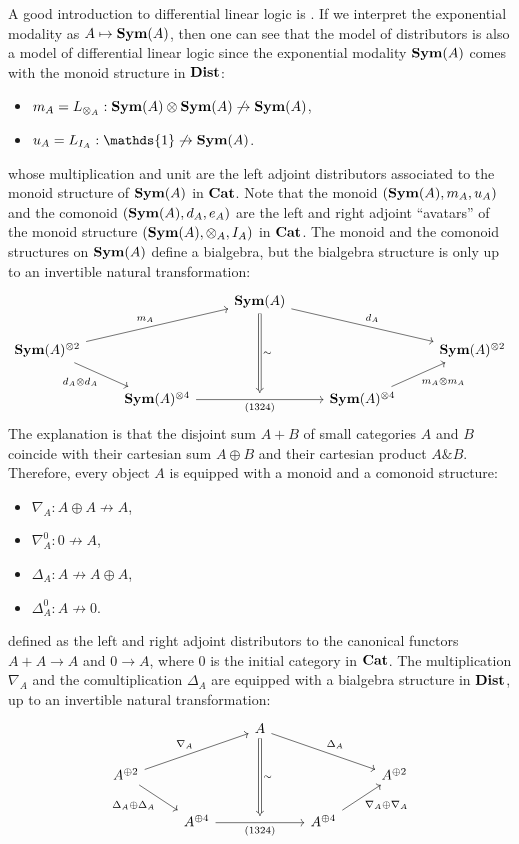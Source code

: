\documentclass[8pt]{article}
\theoremstyle{definition}
\theoremstyle{definition}
\theoremstyle{definition}
\theoremstyle{definition}
\theoremstyle{definition}
\theoremstyle{definition}
\theoremstyle{definition}
\theoremstyle{definition}
\theoremstyle{definition}
\theoremstyle{definition}
\theoremstyle{definition}
\theoremstyle{definition}
\theoremstyle{definition}
\theoremstyle{definition}
\theoremstyle{question}
\begin{document}
A good introduction to differential linear logic is \cite{ehrhard2018introduction}. If we interpret the
exponential modality as $A \mapsto {\bf Sym}(A)$, then one can see that the model of distributors is also a model
of differential linear logic since the exponential modality ${\bf Sym}(A)$ comes with the monoid structure in
${\bf Dist}$:
\begin{itemize}
  \item $m_A = L_{\otimes_A} : {\bf Sym}(A) \otimes {\bf Sym}(A) \not\to {\bf Sym}(A)$,
  \item $u_A = L_{I_A} : \mathds{1} \not\to {\bf Sym}(A)$.
\end{itemize}
whose multiplication and unit are the left adjoint distributors associated to the monoid structure of ${\bf Sym}(A)$ in ${\bf Cat}$.
Note that the monoid $({\bf Sym}(A), m_A, u_A)$ and the comonoid $({\bf Sym}(A), d_A, e_A)$ are the left and right adjoint ``avatars'' of the 
monoid structure $({\bf Sym}(A), \otimes_A, I_A)$ in ${\bf Cat}$. The monoid and the comonoid structures on ${\bf Sym}(A)$ define a bialgebra, but the bialgebra
structure is only up to an invertible natural transformation:
\[
\begin{tikzcd}
  && |[alias=symA]| {\bf Sym}(A) \ar[drr, "d_A"] \\
{\bf Sym}(A)^{\otimes 2} \ar[dr, "d_A \otimes d_A"'] \ar[urr, "m_A"] &&&& {\bf Sym}(A)^{\otimes 2} \\
& {\bf Sym}(A)^{\otimes 4} \ar[rr, "(1324)"', ""{name=1324}] && {\bf Sym}(A)^{\otimes 4} \ar[ur, "m_A \otimes m_A"']
\arrow[from=symA,to=1324,Rightarrow,"\sim"]
\end{tikzcd}
\]
The explanation is that the disjoint sum $A + B$ of small categories $A$ and $B$ coincide with their cartesian sum $A \oplus B$
and their cartesian product $A \& B$. Therefore, every object $A$ is equipped with a monoid and a comonoid structure:
\begin{itemize}
  \item $\nabla_A : A \oplus A \not\to A$,
  \item $\nabla^{0}_A : 0 \not\to A$,
  \item $\Delta_A : A \not\to A \oplus A$,
  \item $\Delta^{0}_A :  A \not\to 0$.
\end{itemize}
defined as the left and right adjoint distributors to the canonical functors $A + A \to A$ and $0 \to A$,
where $0$ is the initial category in ${\bf Cat}$. The multiplication $\nabla_A$ and the comultiplication $\Delta_A$ are equipped with a bialgebra
structure in ${\bf Dist}$, up to an invertible natural transformation:
\[
\begin{tikzcd}
  && |[alias=A]| A \ar[drr, "\Delta_A"] \\
A^{\oplus 2} \ar[dr, "\Delta_A \oplus \Delta_A"'] \ar[urr, "\nabla_A"] &&&& A^{\oplus 2} \\
& A^{\oplus 4} \ar[rr, "(1324)"', ""{name=1324}] && A^{\oplus 4} \ar[ur, "\nabla_A \oplus \nabla_A"']
\arrow[from=A, to=1324, Rightarrow, "\sim"]
\end{tikzcd}
\]
\end{document}
